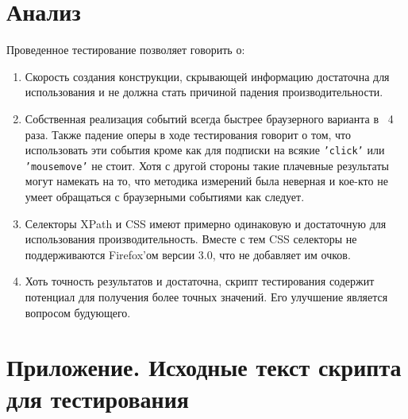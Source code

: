 \documentclass[a4papre,12pt]{article}
\begin{document}
\section{Анализ}

Проведенное тестирование позволяет говорить о:
\begin{enumerate}
\item Скорость создания конструкции, скрывающей информацию достаточна для
  использования и не должна стать причиной падения производительности.
\item Собственная реализация событий всегда быстрее браузерного варианта в
  ~4 раза. Также падение оперы в ходе тестирования говорит о том, что
  использовать эти события кроме как для подписки на всякие {\tt 'click'} или
  {\tt 'mousemove'} не стоит. Хотя с другой стороны такие плачевные
  результаты могут намекать на то, что методика измерений была неверная и
  кое-кто не умеет обращаться с браузерными событиями как следует.
\item Селекторы XPath и CSS имеют примерно одинаковую и достаточную для
  использования производительность. Вместе с тем CSS селекторы не
  поддерживаются Firefox'ом версии 3.0, что не добавляет им очков.
\item Хоть точность результатов и достаточна, скрипт тестирования содержит
  потенциал для получения более точных значений. Его улучшение является
  вопросом будующего.
\end{enumerate}

\newpage

\section*{Приложение. Исходные текст скрипта для тестирования}
\end{document}

